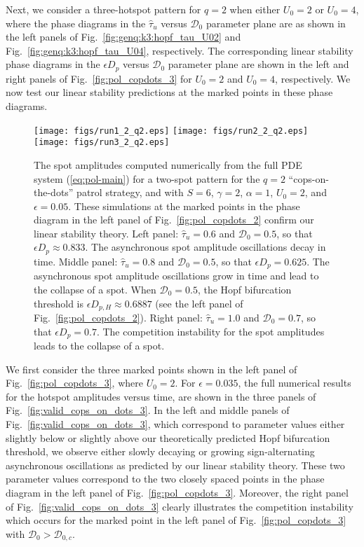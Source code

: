 \documentclass{article}%
\begin{document}
Next, we consider a three-hotspot pattern for $q=2$ when either
$U_0=2$ or $U_0=4$, where the phase diagrams in the $\hat{\tau}_u$
versus ${\mathcal D}_0$ parameter plane are as shown in the left
panels of Fig.~\ref{fig:genq:k3:hopf_tau_U02} and
Fig.~\ref{fig:genq:k3:hopf_tau_U04}, respectively. The corresponding
linear stability phase diagrams in the $\epsilon D_p$ versus
${\mathcal D}_0$ parameter plane are shown in the left and right
panels of Fig.~\ref{fig:pol_copdots_3} for $U_0=2$ and $U_0=4$,
respectively. We now test our linear stability predictions 
at the marked points in these phase diagrams.

\begin{figure}[htbp]
\centering
\texttt{[image: figs/run1\_2\_q2.eps]}
\texttt{[image: figs/run2\_2\_q2.eps]}
\texttt{[image: figs/run3\_2\_q2.eps]}
\caption{\label{fig:valid_cops_on_dots_2} The spot amplitudes
  computed numerically from the full PDE system (\ref{eq:pol-main})
  for a two-spot pattern for the $q=2$ ``cops-on-the-dots'' patrol
  strategy, and with $S=6$, $\gamma=2$, $\alpha=1$, $U_0=2$, and
  $\epsilon=0.05$. These simulations at the marked points in the phase
  diagram in the left panel of Fig.~\ref{fig:pol_copdots_2} confirm
  our linear stability theory.  Left panel: $\hat{\tau}_u=0.6$ and
  ${\mathcal D}_0=0.5$, so that $\epsilon D_p\approx 0.833$. The
  asynchronous spot amplitude oscillations decay in time. Middle
  panel: $\hat{\tau}_u=0.8$ and ${\mathcal D}_0=0.5$, so that
  $\epsilon D_p = 0.625$. The asynchronous spot amplitude
  oscillations grow in time and lead to the collapse of a spot. When
  ${\mathcal D}_0=0.5$, the Hopf bifurcation threshold is
  $\epsilon D_{p,H} \approx 0.6887$ (see the left panel of
  Fig.~\ref{fig:pol_copdots_2}). Right panel: $\hat{\tau}_u=1.0$ and
  ${\mathcal D}_0=0.7$, so that $\epsilon D_p=0.7$. The
  competition instability for the spot amplitudes leads to the
  collapse of a spot.}
\end{figure}


We first consider the three marked points shown in the left panel of
Fig.~\ref{fig:pol_copdots_3}, where $U_0=2$.  For $\epsilon=0.035$,
the full numerical results for the hotspot amplitudes versus time, are
shown in the three panels of Fig.~\ref{fig:valid_cops_on_dots_3}. In
the left and middle panels of Fig.~\ref{fig:valid_cops_on_dots_3},
which correspond to parameter values either slightly below or slightly above
our theoretically predicted Hopf bifurcation threshold, we observe either
slowly decaying or growing sign-alternating asynchronous oscillations as
predicted by our linear stability theory. These two parameter values 
correspond to the two closely spaced points in the phase diagram in the 
left panel of Fig.~\ref{fig:pol_copdots_3}. Moreover, the right panel of
Fig.~\ref{fig:valid_cops_on_dots_3} clearly illustrates the competition
instability which occurs for the marked point in the left panel of
Fig.~\ref{fig:pol_copdots_3} with ${\mathcal D}_0>{\mathcal D}_{0,c}$.
\end{document}

